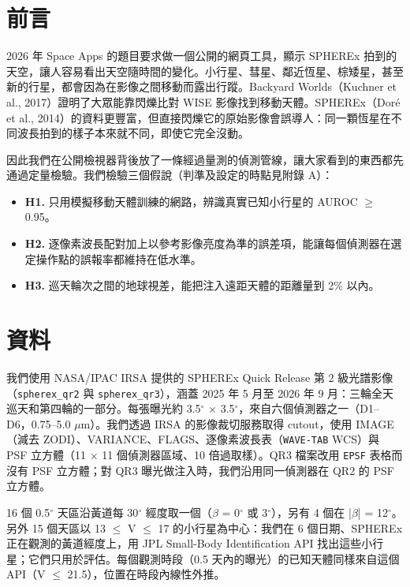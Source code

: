 \documentclass[twocolumn]{aastex631}
\begin{document}
\section{前言}
\label{sec:intro}
2026 年 Space Apps 的題目要求做一個公開的網頁工具，顯示 SPHEREx 拍到的天空，讓人容易看出天空隨時間的變化。小行星、彗星、鄰近恆星、棕矮星，甚至新的行星，都會因為在影像之間移動而露出行蹤。Backyard Worlds（Kuchner et al., 2017）證明了大眾能靠閃爍比對 WISE 影像找到移動天體。SPHEREx（Doré et al., 2014）的資料更豐富，但直接閃爍它的原始影像會誤導人：同一顆恆星在不同波長拍到的樣子本來就不同，即使它完全沒動。

因此我們在公開檢視器背後放了一條經過量測的偵測管線，讓大家看到的東西都先通過定量檢驗。我們檢驗三個假說（判準及設定的時點見附錄 A）：

\begin{itemize}
\item \textbf{H1.} 只用模擬移動天體訓練的網路，辨識真實已知小行星的 AUROC $\ge$ 0.95。
\item \textbf{H2.} 逐像素波長配對加上以參考影像亮度為準的誤差項，能讓每個偵測器在選定操作點的誤報率都維持在低水準。
\item \textbf{H3.} 巡天輪次之間的地球視差，能把注入遠距天體的距離量到 2\% 以內。
\end{itemize}

\section{資料}
\label{sec:data}
我們使用 NASA/IPAC IRSA 提供的 SPHEREx Quick Release 第 2 級光譜影像（\texttt{spherex\_qr2} 與 \texttt{spherex\_qr3}），涵蓋 2025 年 5 月至 2026 年 9 月：三輪全天巡天和第四輪的一部分。每張曝光約 3.5$^\circ$ $\times$ 3.5$^\circ$，來自六個偵測器之一（D1--D6，0.75--5.0 $\mu$m）。我們透過 IRSA 的影像裁切服務取得 cutout，使用 IMAGE（減去 ZODI）、VARIANCE、FLAGS、逐像素波長表（\texttt{WAVE-TAB} WCS）與 PSF 立方體（11 $\times$ 11 個偵測器區域、10 倍過取樣）。QR3 檔案改用 \texttt{EPSF} 表格而沒有 PSF 立方體；對 QR3 曝光做注入時，我們沿用同一偵測器在 QR2 的 PSF 立方體。

16 個 0.5$^\circ$ 天區沿黃道每 30$^\circ$ 經度取一個（$\beta$ = 0$^\circ$ 或 3$^\circ$），另有 4 個在 |$\beta$| = 12$^\circ$。另外 15 個天區以 13 $\le$ V $\le$ 17 的小行星為中心：我們在 6 個日期、SPHEREx 正在觀測的黃道經度上，用 JPL Small-Body Identification API 找出這些小行星；它們只用於評估。每個觀測時段（0.5 天內的曝光）的已知天體同樣來自這個 API（V $\le$ 21.5），位置在時段內線性外推。
\end{document}
